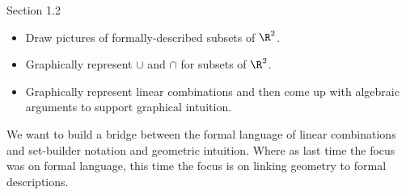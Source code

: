\begin{lesson}

	Section 1.2

	\begin{itemize}
		\item Draw pictures of formally-described subsets of $\R^2$.
		\item Graphically represent $\cup$ and $\cap$ for subsets of $\R^2$.
		\item Graphically represent linear combinations and then come up with
			algebraic arguments to support graphical intuition.
	\end{itemize}


	We want to build a bridge between the formal language of linear combinations
	and set-builder notation and geometric intuition. Where as last time
	the focus was on formal language, this time the focus is on linking geometry
	to formal descriptions.


\end{lesson}

